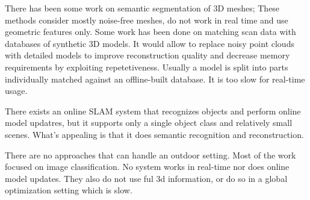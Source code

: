 \documentclass{llncs}
\begin{document}
      There has been some work on semantic segmentation of 3D meshes; These methods consider mostly noise-free meshes, do not work in real time and use geometric features only. Some work has been done on matching scan data with databases of synthetic 3D models. It would allow to replace noisy point clouds with detailed models to improve reconstruction quality and decrease memory requirements by exploiting repetetiveness. Usually a model is split into parts individually matched against an offline-built database. It is too slow for real-time usage. 
      
      There exists an online SLAM system that recognizes objects and perform online model updatres, but it supports only a single object class and relatively small scenes. What's appealing is that it does semantic recognition and reconstruction.
      
      There are no approaches that can handle an outdoor setting. Most of the work focused on image classification. No system works in real-time nor does online model updates. They also do not use ful 3d information, or do so in a global optimization setting which is slow. 
    
\end{document}
